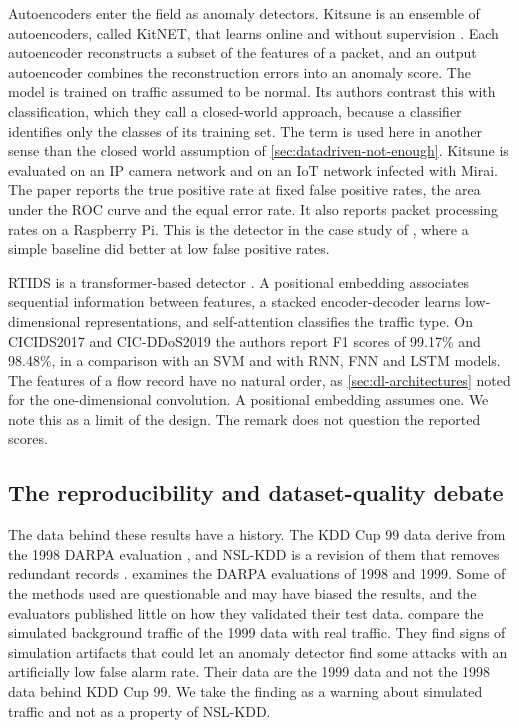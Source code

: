 Autoencoders enter the field as anomaly detectors. Kitsune is an ensemble of
autoencoders, called KitNET, that learns online and without supervision
\citep{mirsky2018kitsune}. Each autoencoder reconstructs a subset of the
features of a packet, and an output autoencoder combines the reconstruction
errors into an anomaly score. The model is trained on traffic assumed to be
normal. Its authors contrast this with classification, which they call a
closed-world approach, because a classifier identifies only the classes of its
training set. The term is used here in another sense than the closed world
assumption of \cref{sec:datadriven-not-enough}. Kitsune is evaluated on an IP camera network and on an IoT
network infected with Mirai. The paper reports the true positive rate at fixed
false positive rates, the area under the ROC curve and the equal error rate.
It also reports packet processing rates on a Raspberry Pi. This is the
detector in the case study of \citet{arp2022dosdonts}, where a simple baseline
did better at low false positive rates.

RTIDS is a transformer-based detector \citep{wu2022rtids}. A positional
embedding associates sequential information between features, a stacked
encoder-decoder learns low-dimensional representations, and self-attention
classifies the traffic type. On CICIDS2017 and CIC-DDoS2019 the authors report
F1 scores of 99.17\% and 98.48\%, in a comparison with an SVM and with RNN,
FNN and LSTM models. The features of a flow record have no natural order, as
\cref{sec:dl-architectures} noted for the one-dimensional convolution. A
positional embedding assumes one. We note this as a limit of the design. The remark
does not question the reported scores.

\subsection{The reproducibility and dataset-quality debate}
\label{sec:dataset-quality-debate}

The data behind these results have a history. The KDD Cup 99 data derive from
the 1998 DARPA evaluation \citep{kddcup1999task}, and NSL-KDD is a revision of
them that removes redundant records \citep{cic2009nslkdd}.
\citet{mchugh2000testing} examines the DARPA evaluations of 1998 and 1999. Some
of the methods used are questionable and may have biased the results, and the
evaluators published little on how they validated their test data.
\citet{mahoney2003analysis} compare the simulated background traffic of the
1999 data with real traffic. They find signs of simulation artifacts that could
let an anomaly detector find some attacks with an artificially low false alarm
rate. Their data are the 1999 data and not the 1998
data behind KDD Cup 99. We take the finding as a warning about simulated
traffic and not as a property of NSL-KDD.

